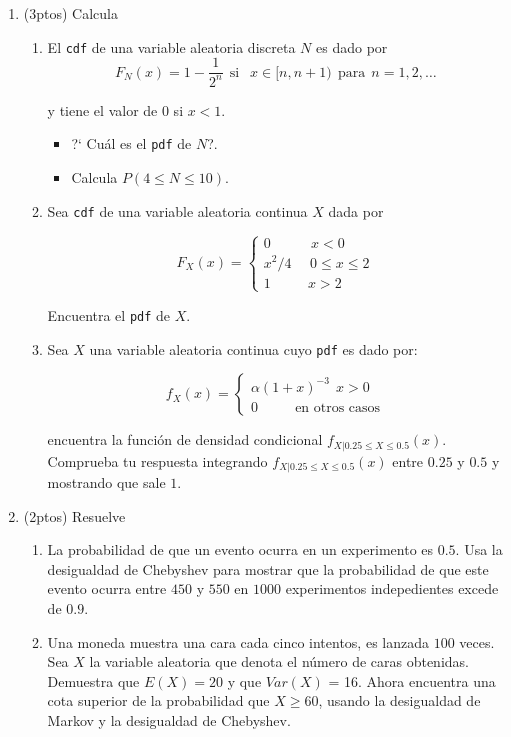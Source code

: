 \documentclass[a4paper,11pt]{report}
\begin{document}
\begin{enumerate}
\begin{enumerate}
\end{enumerate}
\item (3ptos) Calcula 

\begin{enumerate}
	
\item El \texttt{cdf} de una variable aleatoria discreta $N$ es dado por
\[
F_{N}(x) = 1 - \dfrac{1}{2^n} \ \ \text{si }\ \ x\in[n, n +1)\ \ \text{para} \ \ n =1,2,\dots
\]	

y tiene el valor de $0$ si $x <1$.

\begin{itemize}
	\item ?` Cu\'al es el \texttt{pdf} de $N$?.
	\item Calcula $P(4 \leq N \leq 10)$.
\end{itemize}
\item Sea \texttt{cdf} de una variable aleatoria continua $X$ dada por

\[
F_{X} (x) = \begin{cases}
0 \ \ \ \ \ \ \ \ \ \ \ \ \ x <  0\\
x^2/4 \ \ \ \ \ \  0 \leq x \leq 2 \\
1 \ \ \ \ \ \ \ \ \ \ \ \  x > 2
\end{cases}
\]

Encuentra el \texttt{pdf} de $X$.
\item Sea $X$ una variable aleatoria continua cuyo \texttt{pdf} es dado por:

\[
f_{X}(x) = \begin{cases}
\alpha (1 + x)^{-3}\ \  x> 0\\
0 \ \ \ \ \ \ \ \ \ \ \ \ \text{en otros casos}
\end{cases}
\]


encuentra la funci\'on de densidad condicional $f_{X|0.25 \leq X \leq 0.5}(x)$. Comprueba tu respuesta integrando $f_{X|0.25 \leq X \leq 0.5}(x)$ entre $0.25$ y $0.5$ y mostrando que sale $1$.

\end{enumerate}

\item (2ptos)  Resuelve

\begin{enumerate}
\item La probabilidad de que un evento ocurra en un experimento es $0.5$. Usa la desigualdad de Chebyshev para mostrar que la probabilidad de que este evento ocurra entre $450$ y $550$  en $1000$ experimentos indepedientes excede de $0.9$. 
\item Una moneda muestra  una cara  cada cinco intentos, es lanzada  $100$ veces. Sea $X$ la variable aleatoria que denota el n\'umero de caras  obtenidas. Demuestra  que $E(X) = 20$ y que $Var(X)$ = 16. Ahora encuentra una cota  superior de la probabilidad  que $X \geq 60$, usando la desigualdad de Markov y la desigualdad de Chebyshev.
\end{enumerate}
\end{enumerate}
\end{document}
